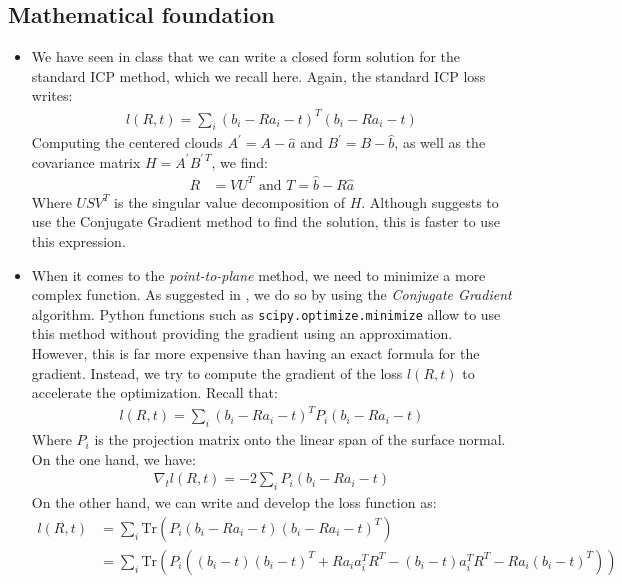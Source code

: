 \documentclass[11pt,letterpaper,leqno]{article}
\begin{document}
\subsection{Mathematical foundation} \label{sec:mathfoundation}
\begin{itemize}
    \item We have seen in class that we can write a closed form solution for the standard ICP method, which we recall here. Again, the standard ICP loss writes:
    \begin{align*}
        l(R,t) = \sum_i  (b_i - R a_i -t)^T (b_i - R a_i -t)
    \end{align*}
    Computing the centered clouds $A^\prime = A - \hat{a}$ and $B^\prime = B - \hat{b}$, as well as the covariance matrix $H = A^\prime B^{\prime \, T}$, we find:
    \begin{align}
        R &= VU^T \text{ and } T = \hat{b} - R \hat{a} \label{eq:icp}
    \end{align}
    Where $USV^T$ is the singular value decomposition of $H$. Although \cite{generalized-icp} suggests to use the Conjugate Gradient method to find the solution, this is faster to use this expression.
    \item When it comes to the \textit{point-to-plane} method, we need to minimize a more complex function. As suggested in \cite{generalized-icp}, we do so by using the \textit{Conjugate Gradient} algorithm. Python functions such as \texttt{scipy.optimize.minimize} allow to use this method without providing the gradient using an approximation. However, this is far more expensive than having an exact formula for the gradient. Instead, we try to compute the gradient of the loss $l(R,t)$ to accelerate the optimization. Recall that:
    \begin{align*}
        l(R,t) = \sum_i (b_i - R a_i -t)^T P_i (b_i - R a_i -t)
    \end{align*}
    Where $P_i$ is the projection matrix onto the linear span of the surface normal. On the one hand, we have:
    \begin{align}
        \nabla_t l(R,t) = - 2 \sum_i P_i (b_i - R a_i -t)
    \end{align}
    On the other hand, we can write and develop the loss function as:
    \begin{align*}
        l(R,t) &= \sum_i \text{Tr}(P_i (b_i - R a_i - t) (b_i - R a_i - t)^T) \\
        &= \sum_i \text{Tr}\left(P_i \left( (b_i - t)(b_i - t)^T + R a_i a_i^T R^T - (b_i-t)a_i^T R^T - R a_i(b_i-t)^T\right) \right)\\

\end{align*}
\end{itemize}
\end{document}
